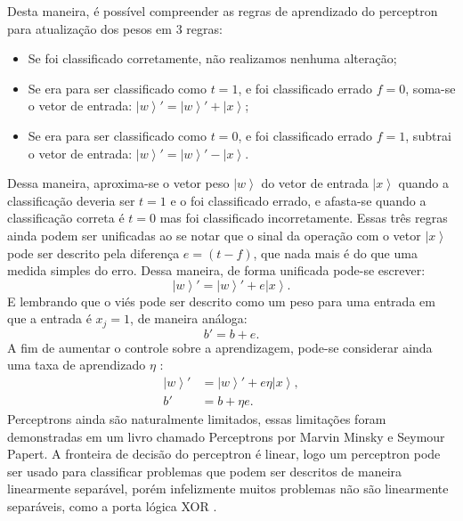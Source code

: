 Desta maneira, é possível compreender as regras de aprendizado do perceptron para atualização dos pesos em 3 regras:
 
 \begin{itemize}
	 \item Se foi classificado corretamente, não realizamos nenhuma alteração;
 \item Se era para ser classificado como $t=1$, e foi classificado errado $f=0$, soma-se o vetor de entrada: $\left|w\right\rangle '=\left|w\right\rangle '+\left|x\right\rangle $;
 \item Se era para ser classificado como $t=0$, e foi classificado errado $f=1$, subtrai o vetor de entrada: $\left|w\right\rangle '=\left|w\right\rangle '-\left|x\right\rangle $.
 \end{itemize}
 
 Dessa maneira, aproxima-se o vetor peso $\left|w\right\rangle$ do vetor de entrada $\left|x\right\rangle $ quando a classificação deveria ser $t=1$ e o foi classificado errado, e afasta-se quando a classificação correta é $t=0$ mas foi classificado incorretamente.  Essas três regras ainda podem ser unificadas ao se notar que o sinal da operação com o vetor $\left|x\right\rangle $  pode ser descrito pela diferença $e=\left(t-f\right)$, que nada mais é do que uma medida simples do erro. Dessa maneira, de forma unificada pode-se escrever: \begin{equation}\left|w\right\rangle '=\left|w\right\rangle '+e\left|x\right\rangle . \end{equation}
E lembrando que o viés pode ser descrito como um peso para uma entrada em que a entrada é $x_j=1$, de maneira análoga:
\begin{equation}b'=b+e . \end{equation}
A fim de aumentar o controle sobre a aprendizagem, pode-se considerar ainda uma taxa de aprendizado $\eta$ :
\begin{equation}
\begin{split}
\left|w\right\rangle ' & =\left|w\right\rangle '+ e \eta \left|x\right\rangle, \\
b' & =b+\eta e.
\end{split}
\end{equation}
Perceptrons ainda são naturalmente limitados, essas limitações foram demonstradas em um livro chamado Perceptrons por Marvin Minsky e Seymour Papert. A fronteira de decisão do perceptron é linear, logo um perceptron pode ser usado para classificar problemas que podem ser descritos de maneira linearmente separável, porém infelizmente muitos problemas não são linearmente separáveis, como a porta lógica XOR \cite{NND}.


